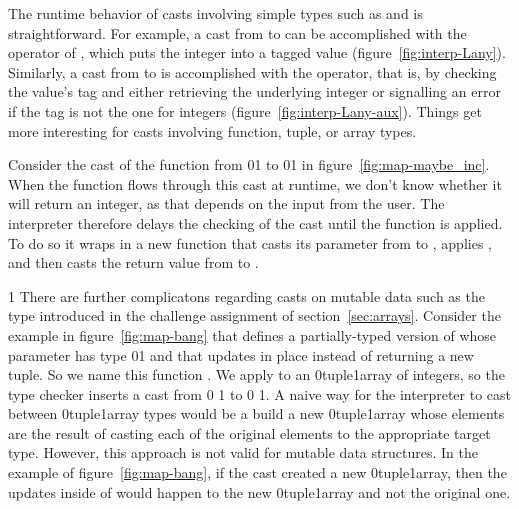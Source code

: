 \documentclass[7x10]{TimesAPriori_MIT}%
\def\racketEd{0}
\def\pythonEd{1}
\def\edition{0}
\newcommand{\racket}[1]{{\if\edition\racketEd{#1}\fi}}
\newcommand{\python}[1]{{\if\edition\pythonEd #1\fi}}
\numberwithin{theorem}{chapter}
\numberwithin{definition}{chapter}
\numberwithin{equation}{chapter}
\begin{document}
The runtime behavior of casts involving simple types such as
\INTTY{} and \BOOLTY{} is straightforward.  For example, a
cast from \INTTY{} to \CANYTY{} can be accomplished with the
 operator of \LangAny{}, which puts the integer into a
tagged value (figure~\ref{fig:interp-Lany}). Similarly, a cast from
\CANYTY{} to \INTTY{} is accomplished with the 
operator, that is, by checking the value's tag and either retrieving
the underlying integer or signalling an error if the tag is not the
one for integers (figure~\ref{fig:interp-Lany-aux}).
%
Things get more interesting for casts involving function, tuple, or array
types.

Consider the cast of the function  from
\racket{}\python{}
to
\racket{}\python{}
in figure~\ref{fig:map-maybe_inc}.
When the  function flows through
this cast at runtime, we don't know whether it will return
an integer, as that depends on the input from the user.
The \LangCast{} interpreter therefore delays the checking
of the cast until the function is applied. To do so it
wraps  in a new function that casts its parameter
from \INTTY{} to \CANYTY{}, applies , and then
casts the return value from \CANYTY{} to \INTTY{}.


{\if\edition\pythonEd
%
There are further complicatons regarding casts on mutable data
such as the  type introduced in
the challenge assignment of section~\ref{sec:arrays}.
%
\fi}
%
Consider the example in figure~\ref{fig:map-bang} that
defines a partially-typed version of  whose parameter
 has type
\racket{}\python{}
and that updates  in place
instead of returning a new tuple. So we name this function
. We apply  to an
\racket{tuple}\python{array} of integers, so the type checker inserts a
cast from
\racket{}
\python{}
to
\racket{}
\python{}.
A naive way for the \LangCast{} interpreter to cast between
\racket{tuple}\python{array} types would be a build a new
\racket{tuple}\python{array}
whose elements are the result
of casting each of the original elements to the appropriate target
type.
However, this approach is not valid for mutable data structures.
In the example of figure~\ref{fig:map-bang},
if the cast created a new \racket{tuple}\python{array}, then the updates inside of
 would happen to the new \racket{tuple}\python{array} and not
the original one.
\end{document}
